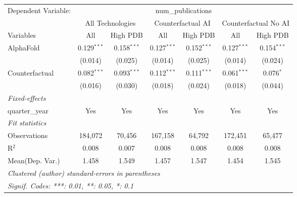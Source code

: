 \begingroup
\centering
\begin{tabular}{lcccccc}
   \tabularnewline \midrule \midrule
   Dependent Variable: & \multicolumn{6}{c}{num\_publications}\\
 & \multicolumn{2}{c}{All Technologies} & \multicolumn{2}{c}{Counterfactual AI} & \multicolumn{2}{c}{Counterfactual No AI} \\
\cmidrule(lr){1-1}\cmidrule(lr){2-3} \cmidrule(lr){4-5} \cmidrule(lr){6-7}
Variables & \multicolumn{1}{c}{All} & \multicolumn{1}{c}{High PDB} & \multicolumn{1}{c}{All} & \multicolumn{1}{c}{High PDB} & \multicolumn{1}{c}{All} & \multicolumn{1}{c}{High PDB} \\
\cmidrule(lr){1-1}\cmidrule(lr){2-2} \cmidrule(lr){3-3} \cmidrule(lr){4-4} \cmidrule(lr){5-5} \cmidrule(lr){6-6} \cmidrule(lr){7-7}
   AlphaFold      & 0.129$^{***}$ & 0.158$^{***}$ & 0.127$^{***}$ & 0.152$^{***}$ & 0.127$^{***}$ & 0.154$^{***}$\\   
                  & (0.014)       & (0.025)       & (0.014)       & (0.025)       & (0.014)       & (0.024)\\   
   Counterfactual & 0.082$^{***}$ & 0.093$^{***}$ & 0.112$^{***}$ & 0.111$^{***}$ & 0.061$^{***}$ & 0.076$^{*}$\\   
                  & (0.016)       & (0.030)       & (0.018)       & (0.024)       & (0.018)       & (0.044)\\   
   \midrule
   \emph{Fixed-effects}\\
   quarter\_year  & Yes           & Yes           & Yes           & Yes           & Yes           & Yes\\  
   \midrule
   \emph{Fit statistics}\\
   Observations   & 184,072       & 70,456        & 167,158       & 64,792        & 172,451       & 65,477\\  
   R$^2$          & 0.008         & 0.007         & 0.008         & 0.008         & 0.008         & 0.008\\  
Mean(Dep. Var.) & 1.458 & 1.549 & 1.457 & 1.547 & 1.454 & 1.545 \\
   \midrule \midrule
   \multicolumn{7}{l}{\emph{Clustered (author) standard-errors in parentheses}}\\
   \multicolumn{7}{l}{\emph{Signif. Codes: ***: 0.01, **: 0.05, *: 0.1}}\\
\end{tabular}
\par\endgroup
